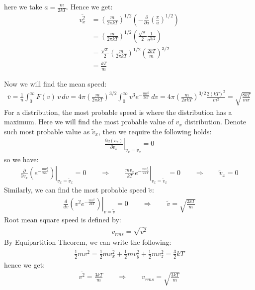 \documentclass[11pt,oneside]{book}
\theoremstyle{break}
\theoremstyle{break}
\begin{document}
here we take $a = \frac{m}{2kT}$. Hence we get:
\begin{align*}
\overline{v_x^2} &= \left(\frac{m}{2\pi kT}\right)^{1/2}\left( -\frac{\partial}{\partial a}\left(\frac{\pi}{a}\right)^{1/2}\right)\\
&=\left(\frac{m}{2\pi kT}\right)^{1/2}\left( \frac{\sqrt{\pi}}{2}\frac{1}{a^{3/2}}\right) \\
&= \frac{\sqrt{\pi}}{2}\left(\frac{m}{2\pi kT}\right)^{1/2} \left( \frac{2kT}{m}\right)^{3/2}\\
&= \frac{kT}{m} 
\end{align*}

Now we will find the mean speed:
\begin{align*}
\overline{v} = \frac{1}{n}\int_{0}^{\infty} F(v)\,v\, dv = 4\pi \left( \frac{m}{2\pi kT}\right)^{3/2}\int_0^{\infty} v^3 e^{-\frac{mv^2}{2kT}}\, dv = 4\pi \left( \frac{m}{2\pi kT}\right)^{3/2}  \frac{2(kT)^2}{m^2} = \sqrt{\frac{8kT}{m\pi}}
\end{align*}
\hfill\break
\hfill\break
For a distribution, the most probable speed is where the distribution has a maximum. Here we will find the most probable value of $v_x$ distribution. Denote such most probable value as $\widetilde{v}_x$, then we require the following holds:
\begin{align*}
\left.\frac{\partial g(v_x)}{\partial v_x} \right|_{v_x = \widetilde{v}_x} = 0
\end{align*}
so we have:
\begin{align*}
\left.\frac{\partial}{\partial v_x}\left( e^{-\frac{mv_x^2}{2kT}}\right)\right|_{v_x = \widetilde{v}_x} = 0 \qquad \Rightarrow \qquad\left. \frac{mv_x}{kT} e^{-\frac{mv_x^2}{2kT}}\right|_{v_x = \widetilde{v}_x} = 0 \qquad \Rightarrow \qquad \widetilde{v}_x = 0
\end{align*}
Similarly, we can find the most probable speed $\widetilde{v}$:
\begin{align*}
\left.\frac{d}{dv}\left( v^2 e^{-\frac{mv^2}{2kT}}\right)\right|_{v=\widetilde{v}} = 0 \qquad \Rightarrow \qquad \widetilde{v} = \sqrt{\frac{2kT}{m}}
\end{align*}
\hfill\break
Root mean square speed is defined by:
\begin{align*}
v_{rms} = \sqrt{\overline{v^2}} 
\end{align*}
By Equipartition Theorem, we can write the following:
\begin{align*}
\frac{1}{2}m \overline{v^2} = \frac{1}{2}m \overline{v_x^2} + \frac{1}{2}m \overline{v_y^2} + \frac{1}{2}m \overline{v_z^2} = \frac{3}{2}kT
\end{align*}
hence we get:
\begin{align*}
\overline{v^2} = \frac{3kT}{m}\qquad \Rightarrow \qquad v_{rms} = \sqrt{\frac{3kT}{m}}
\end{align*}
\end{document}
